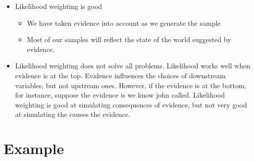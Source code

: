 \documentclass[11pt,a4paper]{report}
\begin{document}
\begin{itemize}
    \item Likelihood weighting is good
        \begin{itemize}
            \item We have taken evidence into account as we generate the sample
            \item Most of our samples will reflect the  state of the world suggested by evidence.
        \end{itemize}
    
    \item Likelihood weighting does not solve all problems. Likelihood works well when evidence is at the top. Evidence influences the choices of downstream variables, but not upstream ones. However, if the evidence is at the bottom, for instance, suppose the evidence is we know john called. Likelihood weighting is good at simulating consequences of evidence, but not very good at simulating the causes the evidence.
\end{itemize}

\section{Example}
\end{document}

